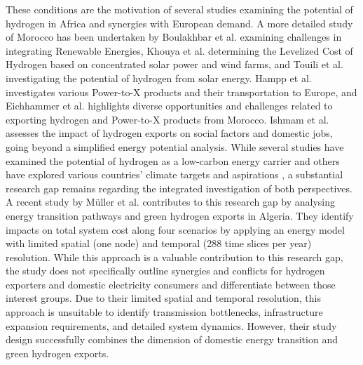 \documentclass[5p,numafflabel]{elsarticle}
\begin{document}
These conditions are the motivation of several studies \cite{vanWijk2021, AbouSeada2022, vanderZwaan2021, Schellekens2010, Cavana2021, Touili2022, Timmerberg2019, Sens2022, Franzmann2023} examining the potential of hydrogen in Africa and synergies with European demand. A more detailed study of Morocco has been undertaken by Boulakhbar et al.\cite{Boulakhbar2020} examining challenges in integrating Renewable Energies, Khouya et al.\cite{Khouya2020} determining the Levelized Cost of Hydrogen based on concentrated solar power and wind farms, and Touili et al.\cite{Touili2018} investigating the potential of hydrogen from solar energy. Hampp et al.\cite{Hampp2023} investigates various Power-to-X products and their transportation to Europe, and Eichhammer et al. \cite{Eichhammer2019} highlights diverse opportunities and challenges related to exporting hydrogen and Power-to-X products from Morocco. Ishmam et al. \cite{Ishmam2024} assesses the impact of hydrogen exports on social factors and domestic jobs, going beyond a simplified energy potential analysis.
While several studies \cite{Hampp2023, AbouSeada2022, vanWijk2021} have examined the potential of hydrogen as a low-carbon energy carrier and others have explored various countries' climate targets and aspirations \cite{Boulakhbar2020}, a substantial research gap remains regarding the integrated investigation of both perspectives. 
A recent study by Müller et al.\cite{Muller2024} contributes to this research gap by analysing energy transition pathways and green hydrogen exports in Algeria. They identify impacts on total system cost along four scenarios by applying an energy model with limited spatial (one node) and temporal (288 time slices per year) resolution. While this approach is a valuable contribution to this research gap, the study does not specifically outline synergies and conflicts for hydrogen exporters and domestic electricity consumers and differentiate between those interest groups. 
Due to their limited spatial and temporal resolution, this approach is unsuitable to identify transmission bottlenecks, infrastructure expansion requirements, and detailed system dynamics. However, their study design successfully combines the dimension of domestic energy transition and green hydrogen exports.
\end{document}
